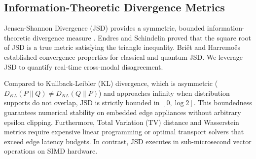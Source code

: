 \documentclass[conference]{IEEEtran}
\begin{document}
\subsection{Information-Theoretic Divergence Metrics}
Jensen-Shannon Divergence (JSD) provides a symmetric, bounded information-theoretic divergence measure \cite{b15, b16}. Endres and Schindelin \cite{b17} proved that the square root of JSD is a true metric satisfying the triangle inequality. Briët and Harremoës \cite{b18} established convergence properties for classical and quantum JSD. We leverage JSD to quantify real-time cross-modal disagreement.

Compared to Kullback-Leibler (KL) divergence, which is asymmetric ($D_{KL}(P \parallel Q) \neq D_{KL}(Q \parallel P)$) and approaches infinity when distribution supports do not overlap, JSD is strictly bounded in $[0, \log 2]$. This boundedness guarantees numerical stability on embedded edge appliances without arbitrary epsilon clipping. Furthermore, Total Variation (TV) distance and Wasserstein metrics require expensive linear programming or optimal transport solvers that exceed edge latency budgets. In contrast, JSD executes in sub-microsecond vector operations on SIMD hardware.

\begin{table}[htbp]
\caption{Comparative Taxonomy of Multimodal Fusion and Recovery Paradigms}
\centering
{}
\label{tab:p24_taxonomy}
\end{table}
\end{document}
